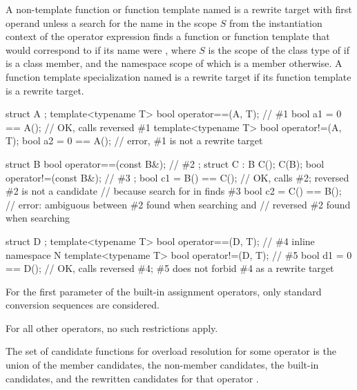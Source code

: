 \pnum
A non-template function or function template  named 
is a rewrite target with first operand 
unless a search for the name  in the scope $S$
from the instantiation context of the operator expression
finds a function or function template
that would correspond to 
if its name were ,
where $S$ is the scope of the class type of 
if  is a class member, and
the namespace scope of which  is a member otherwise.
A function template specialization named  is a rewrite target
if its function template is a rewrite target.
\begin{example}
\begin{codeblock}
struct A {};
template<typename T> bool operator==(A, T);     // \#1
bool a1 = 0 == A();                             // OK, calls reversed \#1
template<typename T> bool operator!=(A, T);
bool a2 = 0 == A();                             // error, \#1 is not a rewrite target

struct B {
  bool operator==(const B&);    // \#2
};
struct C : B {
  C();
  C(B);
  bool operator!=(const B&);    // \#3
};
bool c1 = B() == C();           // OK, calls \#2; reversed \#2 is not a candidate
                                // because search for  in  finds \#3
bool c2 = C() == B();           // error: ambiguous between \#2 found when searching  and
                                // reversed \#2 found when searching 

struct D {};
template<typename T> bool operator==(D, T);     // \#4
inline namespace N {
  template<typename T> bool operator!=(D, T);   // \#5
}
bool d1 = 0 == D();             // OK, calls reversed \#4; \#5 does not forbid \#4 as a rewrite target
\end{codeblock}
\end{example}

\pnum
For the first parameter of the built-in assignment operators,
only standard conversion sequences are considered.

\pnum
For all other operators, no such restrictions apply.

\pnum
The set of candidate functions for overload resolution
for some operator 
is the
union of
the member candidates,
the non-member candidates,
the built-in candidates,
and the rewritten candidates
for that operator .

